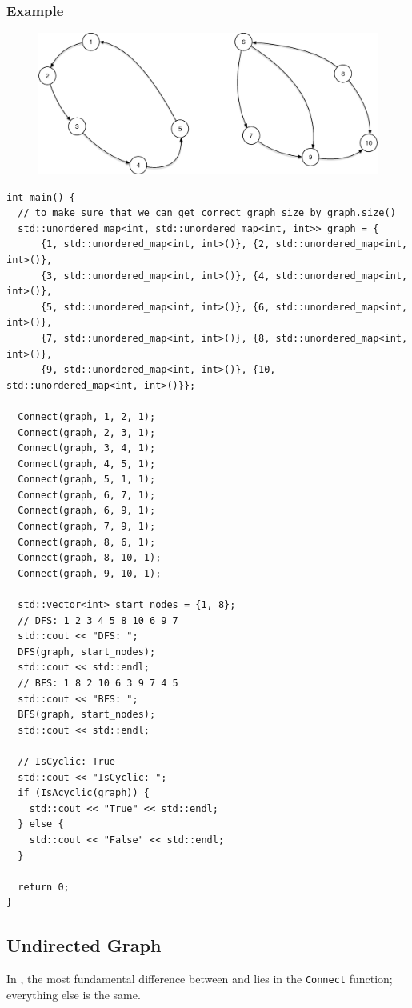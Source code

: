 \subsubsection{Example}
\begin{figure}[H]
\centering
\includegraphics[width=0.7\linewidth]{images/directed_graph_eg}
\end{figure}

\begin{lstlisting}
int main() {
  // to make sure that we can get correct graph size by graph.size()
  std::unordered_map<int, std::unordered_map<int, int>> graph = {
      {1, std::unordered_map<int, int>()}, {2, std::unordered_map<int, int>()},
      {3, std::unordered_map<int, int>()}, {4, std::unordered_map<int, int>()},
      {5, std::unordered_map<int, int>()}, {6, std::unordered_map<int, int>()},
      {7, std::unordered_map<int, int>()}, {8, std::unordered_map<int, int>()},
      {9, std::unordered_map<int, int>()}, {10, std::unordered_map<int, int>()}};

  Connect(graph, 1, 2, 1);
  Connect(graph, 2, 3, 1);
  Connect(graph, 3, 4, 1);
  Connect(graph, 4, 5, 1);
  Connect(graph, 5, 1, 1);
  Connect(graph, 6, 7, 1);
  Connect(graph, 6, 9, 1);
  Connect(graph, 7, 9, 1);
  Connect(graph, 8, 6, 1);
  Connect(graph, 8, 10, 1);
  Connect(graph, 9, 10, 1);

  std::vector<int> start_nodes = {1, 8};
  // DFS: 1 2 3 4 5 8 10 6 9 7
  std::cout << "DFS: ";
  DFS(graph, start_nodes);
  std::cout << std::endl;
  // BFS: 1 8 2 10 6 3 9 7 4 5
  std::cout << "BFS: ";
  BFS(graph, start_nodes);
  std::cout << std::endl;

  // IsCyclic: True
  std::cout << "IsCyclic: ";
  if (IsAcyclic(graph)) {
    std::cout << "True" << std::endl;
  } else {
    std::cout << "False" << std::endl;
  }

  return 0;
}
\end{lstlisting}

\subsection{Undirected Graph}
In {\color{blue}{sparse adjacency matrix}}, the most fundamental difference between {\color{blue}{undirected graph}} and {\color{blue}{directed graph}} lies in the {\colorbox{CodeBackground}{\lstinline|Connect|}} function; everything else is the same.

